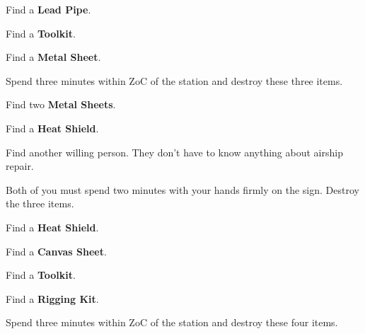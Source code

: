 \documentclass[green]{airship}
\begin{document}
\begin{enum}[Boiler]
  \item Find a {\bf Lead Pipe}.
  \item Find a {\bf Toolkit}.
  \item Find a {\bf Metal Sheet}.
  \item Spend three minutes within ZoC of the station and destroy these three items.
\end{enum}

\begin{enum}[Engine]
  \item Find two {\bf Metal Sheets}.
  \item Find a {\bf Heat Shield}.
  \item Find another willing person. They don't have to know anything about airship repair.
  \item Both of you must spend two minutes with your hands firmly on the sign. Destroy the three items.
\end{enum}

\begin{enum}
  \item Find a {\bf Heat Shield}.
  \item Find a {\bf Canvas Sheet}.
  \item Find a {\bf Toolkit}.
  \item Find a {\bf Rigging Kit}.
  \item Spend three minutes within ZoC of the station and destroy these four items.
\end{enum}
\end{document}
